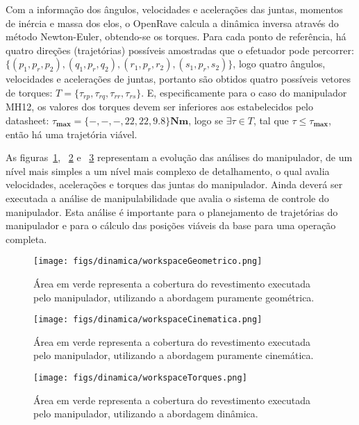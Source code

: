 Com a informação dos ângulos, velocidades e acelerações das juntas, momentos
de inércia e massa dos elos, o OpenRave calcula a dinâmica inversa através do
método Newton-Euler, obtendo-se os torques. Para cada ponto de referência, há quatro direções
(trajetórias) possíveis amostradas que o efetuador pode percorrer:
$\{(p_1,p_r,p_2),(q_1,p_r,q_2),(r_1,p_r,r_2),(s_1,p_r,s_2)\}$, logo quatro
ângulos, velocidades e acelerações de juntas, portanto são obtidos quatro
possíveis vetores de torques:
$T=\{\tau_{rp},\tau_{rq},\tau_{rr},\tau_{rs}\}$. E, especificamente para o
caso do manipulador MH12, os valores dos torques devem ser inferiores aos
estabelecidos pelo datasheet:
$\tau_{\textbf{max}}=\{-,-,-,22,22,9.8\}\textbf{Nm}$, logo se $\exists \tau\in
T$, tal que $\tau\leq\tau_{\textbf{max}}$, então há uma trajetória viável.

As figuras~\ref{fig::wgeo}, ~\ref{fig::wcin} e ~\ref{fig::wdin} representam a
evolução das análises do manipulador, de um nível mais simples a um nível mais
complexo de detalhamento, o qual avalia velocidades, acelerações e torques das
juntas do manipulador. Ainda deverá ser executada a análise de manipulabilidade
que avalia o sistema de controle do manipulador. Esta análise é importante para
o planejamento de trajetórias do manipulador e para o cálculo das posições
viáveis da base para uma operação completa.



\begin{figure}[h!]	
	\texttt{[image: figs/dinamica/workspaceGeometrico.png]}
	\caption{Área em verde representa a cobertura do revestimento executada pelo
	manipulador, utilizando a abordagem puramente geométrica.}
	\label{fig::wgeo}
\end{figure}

\begin{figure}[h!]	
	\texttt{[image: figs/dinamica/workspaceCinematica.png]}
	\caption{Área em verde representa a cobertura do revestimento executada pelo
	manipulador, utilizando a abordagem puramente cinemática.}
	\label{fig::wcin}
\end{figure}

\begin{figure}[h!]	
	\texttt{[image: figs/dinamica/workspaceTorques.png]}
	\caption{Área em verde representa a cobertura do revestimento executada pelo
	manipulador, utilizando a abordagem dinâmica.}
	\label{fig::wdin}
\end{figure}
